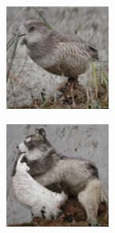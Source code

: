 \documentclass{article}
\begin{document}
\begin{figure}
\begin{subfigure}[b]{0.5\linewidth}
\begin{subfigure}[b]{0.242\linewidth}
        \end{subfigure}
        \hfill
    \end{subfigure}%
    \begin{subfigure}[b]{0.5\linewidth}
        \begin{subfigure}[b]{0.242\linewidth}
        \includegraphics[width=\linewidth]{figures/imagenet128/solver_samples/imagenet128_fm_ot_46_05.png}
        \end{subfigure}
        \begin{subfigure}[b]{0.242\linewidth}
        \includegraphics[width=\linewidth]{figures/imagenet128/solver_samples/imagenet128_fm_ot_46_10.png}

\end{subfigure}
\end{subfigure}
\end{figure}
\end{document}
